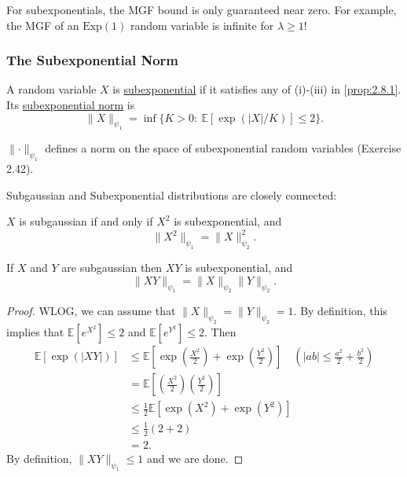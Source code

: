 \begin{remark}
\label{rmk:2.8.3}
For subexponentials, the MGF bound is only guaranteed near zero. For example, the MGF of an $\text{Exp}(1)$ 
random variable is infinite for $\lambda \geq 1$!
\end{remark}


\subsubsection{The Subexponential Norm}
\begin{definition}[]
\label{def:2.8.4}
A random variable $X$ is \underline{subexponential} if it satisfies any of (i)-(iii) in \cref{prop:2.8.1}. 
Its \underline{subexponential norm} is 
\[ \lVert X \rVert_{\psi_1} = \inf\{K > 0: \ \mathbb{E}[\exp{(|X| / K)}] \leq 2\}. \]
\end{definition}
$\lVert \cdot \rVert_{\psi_1}$ defines a norm on the space of subexponential random variables (Exercise 2.42). 

Subgaussian and Subexponential distributions are closely connected: 
\begin{lemma}[]
\label{lem:2.8.5}
$X$ is subgaussian if and only if $X^2$ is subexponential, and 
\[ \lVert X^2 \rVert_{\psi_1} = \lVert X \rVert_{\psi_2}^2. \]
\end{lemma}

\begin{lemma}[]
\label{lem:2.8.6}
If $X$ and $Y$ are subgaussian then $XY$ is subexponential, and 
\[ \lVert XY \rVert_{\psi_1} = \lVert X \rVert_{\psi_2} \lVert Y \rVert_{\psi_2}. \]
\end{lemma}

\begin{proof}
WLOG, we can assume that $\lVert X \rVert_{\psi_2} = \lVert Y \rVert_{\psi_2} = 1$. By definition, this 
implies that $\mathbb{E}[e^{X^2}] \leq 2$ and $\mathbb{E}[e^{Y^2}] \leq 2$. Then 
\begin{align*}
	\mathbb{E}[\exp{(|XY|)}] 
	&\leq \mathbb{E}\left[ \exp{\left( \frac{X^2}{2} \right)} 
	+ \exp{\left( \frac{Y^2}{2} \right)} \right] \quad (|ab| \leq \frac{a^2}{2} + \frac{b^2}{2}) \\
	&= \mathbb{E}\left[ \left( \frac{X^2}{2} \right) \left( \frac{Y^2}{2} \right) \right] \\
	&\leq \frac{1}{2} \mathbb{E}[\exp{(X^2)} + \exp{(Y^2)}] \\
	&\leq \frac{1}{2}(2 + 2) \\
	&= 2.
\end{align*}
By definition, $\lVert XY \rVert_{\psi_1} \leq 1$ and we are done.
\end{proof}

